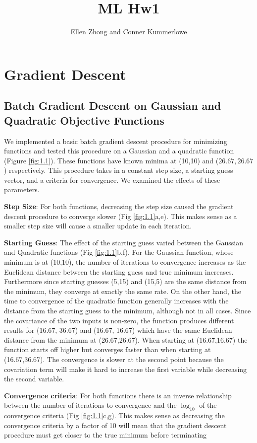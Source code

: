 \documentclass[10pt]{article}
\title{ML Hw1}
\author{Ellen Zhong and Conner Kummerlowe}
\begin{document}
\section{Gradient Descent}

\subsection{Batch Gradient Descent on Gaussian and Quadratic Objective Functions}

 We implemented a basic batch gradient descent procedure for minimizing functions and tested this procedure on a Gaussian and  a quadratic function (Figure \ref{fig:1.1}). These functions have known minima at (10,10) and ($26.67,26.67$) respectively. This procedure takes in a constant step size, a starting guess vector, and a criteria for convergence. We examined the effects of these parameters.
 
 \medskip

 \textbf{Step Size}: For both functions, decreasing the step size caused the gradient descent procedure to converge slower (Fig \ref{fig:1.1}a,e). This makes sense as a smaller step size will cause a smaller update in each iteration. 
 
  \textbf{Starting Guess}: The effect of the starting guess varied between the Gaussian and Quadratic functions (Fig \ref{fig:1.1}b,f). For the Gaussian function, whose minimum is at (10,10), the number of iterations to convergence increases as the Euclidean distance between the starting guess and true minimum increases. Furthermore since starting guesses (5,15) and (15,5) are the same distance from the minimum, they converge at exactly the same rate. On the other hand, the time to convergence of the quadratic function generally increases with the distance from the starting guess to the minimum, although not in all cases. Since the covariance of the two inputs is non-zero, the function produces different results for (16.67, 36.67) and (16.67, 16.67) which have the same Euclidean distance from the minimum at (26.67,26.67). When starting at (16.67,16.67) the function starts off higher but converges faster than when starting at (16.67,36.67). The convergence is slower at the second point because the covariation term will make it hard to increase the first variable while decreasing the second variable. 
  
\textbf{Convergence criteria}: For both functions there is an inverse relationship between the number of iterations to convergence and the $\log_{10}$ of the convergence criteria (Fig \ref{fig:1.1}c,g). This makes sense as decreasing the convergence criteria by a factor of 10 will mean that the gradient descent procedure must get closer to the true minimum before terminating
\end{document}
